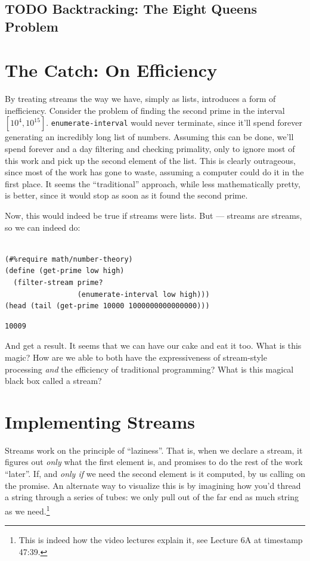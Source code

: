 \documentclass[9pt]{report}
\begin{document}
\subsection{{\bfseries\sffamily TODO} Backtracking: The Eight Queens Problem}
\label{sec:org9db46ea}


\section{The Catch: On Efficiency}
\label{sec:org9d3042a}

By treating streams the way we have, simply as lists, introduces a
form of inefficiency. Consider the problem of finding the second
prime in the interval \([10^4, 10^{15}]\). \texttt{enumerate-interval} would
never terminate, since it'll spend forever generating an incredibly
long list of numbers. Assuming this can be done, we'll spend
forever and a day filtering and checking primality, only to ignore
most of this work and pick up the second element of the list.
This is clearly outrageous, since most of the work has gone to
waste, assuming a computer could do it in the first place. It seems
the ``traditional'' approach, while less mathematically pretty, is
better, since it would stop as soon as it found the second prime.

Now, this would indeed be true if streams were lists. But ---
streams are streams, so we can indeed do:

\begin{verbatim}

(#%require math/number-theory)
(define (get-prime low high)
  (filter-stream prime?
                 (enumerate-interval low high)))
(head (tail (get-prime 10000 1000000000000000)))
\end{verbatim}

\begin{verbatim}
10009
\end{verbatim}


And get a result. It seems that we can have our cake and eat it
too. What is this magic? How are we able to both have the
expressiveness of stream-style processing \emph{and} the efficiency of
traditional programming? What is this magical black box called a
stream?

\section{Implementing Streams}
\label{sec:org23c1c37}

Streams work on the principle of ``laziness''. That is, when we
declare a stream, it figures out \emph{only} what the first element is, and
promises to do the rest of the work ``later''. If, and \emph{only if} we
need the second element is it computed, by us calling on the
promise. An alternate way to visualize this is by imagining how
you'd thread a string through a series of tubes: we only pull out
of the far end as much string as we need.\footnote{This is indeed how the video lectures explain it, see Lecture
6A at timestamp 47:39.}
\end{document}
